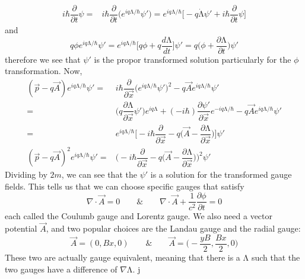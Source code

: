 \begin{recall}
\[\begin{align*}
i\hbar \dfrac{\partial }{\partial t}\psi =&i\hbar \dfrac{\partial }{\partial t}\Big(e^{iq\mathrm{\Lambda }/\hbar }\psi '\Big) 
=e^{iq\mathrm{\Lambda }/\hbar }\Big[-q\dot{\mathrm{\Lambda }}\psi '+i\hbar \dfrac{\partial }{\partial t}\psi  \Big]
\end{align*}\]
and
\[q\phi e^{iq\mathrm{\Lambda }/\hbar }\psi'=e^{iq\mathrm{\Lambda }/\hbar }\Big[q\phi +q\dfrac{d \mathrm{\Lambda }}{d t}\Big] \psi '=q\Big(\phi +\dfrac{\partial \mathrm{\Lambda }}{\partial t} \Big)\psi '\]
therefore we see that $\psi '$ is the propor transformed solution particularly for the $\phi $ transformation. Now, 
\[\begin{align*}
(\vec{p}-q\vec{A})e^{iq\mathrm{\Lambda }/\hbar }\psi '=&i\hbar \dfrac{\partial }{\partial \vec{x}}\Big(e^{iq\mathrm{\Lambda }/\hbar }\psi '\Big)^2-q\vec{A}e^{iq\mathrm{\Lambda }/\hbar }\psi '\\
=&\Big(q\dfrac{\partial \mathrm{\Lambda }}{\partial \vec{x}}\psi ' \Big)e^{iq\mathrm{\Lambda }}+(-i\hbar )\dfrac{\partial \psi '}{\partial \vec{x}}e^{-iq\mathrm{\Lambda }/\hbar }-q\vec{A}e^{iq\mathrm{\Lambda }/\hbar }\psi '\\
=&e^{iq\mathrm{\Lambda }/\hbar }\Big[-i\hbar \dfrac{\partial }{\partial \vec{x}}-q\Big(\vec{A}-\dfrac{\partial \mathrm{\Lambda }}{\partial \vec{x}} \Big) \Big]\psi '\\
(\vec{p}-q\vec{A})^2e^{iq\mathrm{\Lambda} /\hbar }\psi '=&\Big(-i\hbar \dfrac{\partial }{\partial \vec{x}}-q\Big(\vec{A}-\dfrac{\partial \mathrm{\Lambda }}{\partial \vec{x}} \Big) \Big)^2\psi '
\end{align*}\]
Dividing by $2m$, we can see that the $\psi '$ is a solution for the transformed gauge fields. This tells us that we can choose specific gauges that satisfy
\[\nabla \cdot \vec{A}=0\qquad\&\qquad \nabla \cdot \vec{A}+\dfrac{1}{c^2}\dfrac{\partial \phi }{\partial t}=0 \]
each called the Coulumb gauge and Lorentz gauge. We also need a vector potential $\vec{A}$, and two popular choices are the Landau gauge and the radial gauge:  
\[\vec{A}=(0,Bx,0)\qquad\&\qquad \vec{A}=\Big(-\dfrac{yB}{2},\dfrac{Bx}{2},0\Big)\]
These two are actually gauge equivalent, meaning that there is a $\mathrm{\Lambda }$ such that the two gauges have a difference of $\nabla \mathrm{\Lambda }$. j
\end{recall}
\vspace{2ex}
